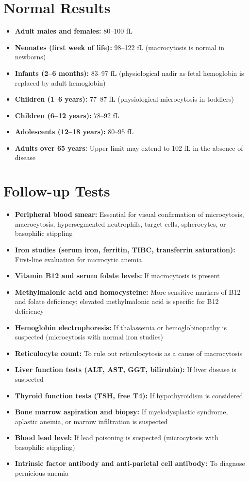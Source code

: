 \section*{Normal Results}
\begin{itemize}
  \item \textbf{Adult males and females:} 80--100 fL \cite{fischbach2023manual}
  \item \textbf{Neonates (first week of life):} 98--122 fL (macrocytosis is normal in newborns)
  \item \textbf{Infants (2--6 months):} 83--97 fL (physiological nadir as fetal hemoglobin is replaced by adult hemoglobin)
  \item \textbf{Children (1--6 years):} 77--87 fL (physiological microcytosis in toddlers)
  \item \textbf{Children (6--12 years):} 78--92 fL
  \item \textbf{Adolescents (12--18 years):} 80--95 fL
  \item \textbf{Adults over 65 years:} Upper limit may extend to 102 fL in the absence of disease
\end{itemize}

\section*{Follow-up Tests}
\begin{itemize}
  \item \textbf{Peripheral blood smear:} Essential for visual confirmation of microcytosis, macrocytosis, hypersegmented neutrophils, target cells, spherocytes, or basophilic stippling
  \item \textbf{Iron studies (serum iron, ferritin, TIBC, transferrin saturation):} First-line evaluation for microcytic anemia
  \item \textbf{Vitamin B12 and serum folate levels:} If macrocytosis is present
  \item \textbf{Methylmalonic acid and homocysteine:} More sensitive markers of B12 and folate deficiency; elevated methylmalonic acid is specific for B12 deficiency
  \item \textbf{Hemoglobin electrophoresis:} If thalassemia or hemoglobinopathy is suspected (microcytosis with normal iron studies)
  \item \textbf{Reticulocyte count:} To rule out reticulocytosis as a cause of macrocytosis
  \item \textbf{Liver function tests (ALT, AST, GGT, bilirubin):} If liver disease is suspected
  \item \textbf{Thyroid function tests (TSH, free T4):} If hypothyroidism is considered
  \item \textbf{Bone marrow aspiration and biopsy:} If myelodysplastic syndrome, aplastic anemia, or marrow infiltration is suspected
  \item \textbf{Blood lead level:} If lead poisoning is suspected (microcytosis with basophilic stippling)
  \item \textbf{Intrinsic factor antibody and anti-parietal cell antibody:} To diagnose pernicious anemia
\end{itemize}

